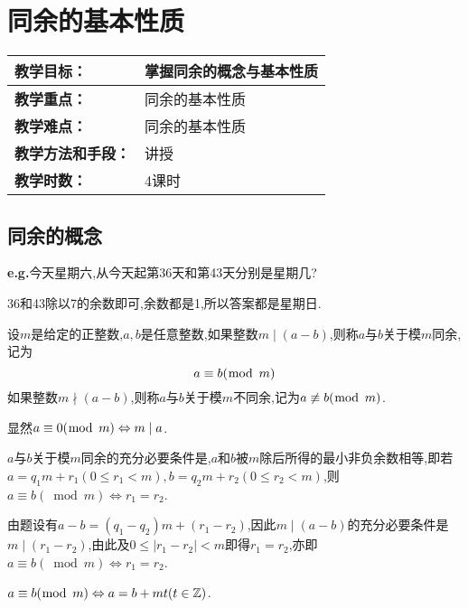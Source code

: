 \section{同余的基本性质}
\begin{table}[htb]
	\centering  
	\begin{tabular}{p{32mm}|p{95.6mm}}
		\hline 
		\textbf{教学目标：}       & 掌握同余的概念与基本性质  \\ \hline
		\textbf{教学重点：}       & 同余的基本性质 \\ \hline
		\textbf{教学难点：}       & 同余的基本性质\\ \hline
		\textbf{教学方法和手段：} & 讲授  \\ \hline
		\textbf{教学时数：}       & 4课时 \\ \hline
	\end{tabular}
\end{table}
\subsection{同余的概念}
\entry \textbf{e.g.}今天星期六,从今天起第36天和第43天分别是星期几?

36和43除以7的余数即可,余数都是1,所以答案都是星期日.

 设$m$是给定的正整数,$a, b$是任意整数,如果整数$m \mid(a-b)$,则称$a$与$b$关于模$m$同余,记为
\begin{equation*}
	a \equiv b(\bmod \hspace{1ex}m)
\end{equation*}
如果整数$m \nmid(a-b)$,则称$a$与$b$关于模$m$不同余,记为$a \not \equiv b(\bmod \hspace{1ex}m)$.

显然$a \equiv 0(\bmod \hspace{1ex}m) \Leftrightarrow m \mid a$.

\theorem $a$与$b$关于模$m$同余的充分必要条件是,$a$和$b$被$m$除后所得的最小非负余数相等,即若$a=q_{1} m+r_{1}\left(0 \leqslant r_{1}<m\right), b=q_{2} m+r_{2}\left(0 \leqslant r_{2}<m\right)$,则$a \equiv b(\bmod m) \Leftrightarrow r_{1}=r_{2}$.

\proof 由题设有$a-b=\left(q_{1}-q_{2}\right) m+\left(r_{1}-r_{2}\right)$,因此$m \mid(a-b)$的充分必要条件是$m \mid\left(r_{1}-r_{2}\right)$,由此及$0 \leqslant\left|r_{1}-r_{2}\right|<m$即得$r_{1}=r_{2}$,亦即$a \equiv b(\bmod m) \Leftrightarrow r_{1}=r_{2}$.

\corollary $a\equiv b(\bmod \hspace{1ex}m)\Leftrightarrow a=b+mt(t\in\mathbb{Z})$.

